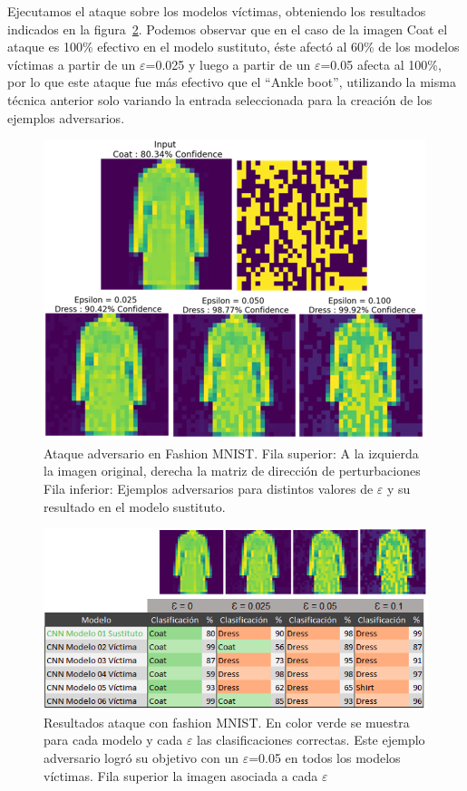 Ejecutamos el ataque sobre los modelos víctimas, obteniendo los resultados indicados en la figura~\ref{fig:41}. Podemos observar que en el caso de la imagen Coat el ataque es 100\% efectivo en el modelo sustituto, éste afectó al 60\% de los modelos víctimas a partir de un $\varepsilon$=0.025 y luego a partir de un $\varepsilon$=0.05 afecta al 100\%, por lo que este ataque fue más efectivo que el “Ankle boot”, utilizando la misma técnica anterior solo variando la entrada seleccionada para la creación de los ejemplos adversarios.

\begin{figure}[!h]
\centering
\includegraphics[scale = 1]{Figures/figura_40.PNG}
\decoRule
\caption[Resultados ataque 2 con fashion MNIST.]{Ataque adversario en Fashion MNIST. 
Fila superior: A la izquierda la imagen original, derecha la matriz de dirección de perturbaciones
Fila inferior: Ejemplos adversarios para distintos valores de $\varepsilon$ y su resultado en el modelo sustituto.
}
\label{fig:40}
\end{figure}


\begin{figure}[!h]
\centering
\includegraphics[scale = 0.85]{Figures/figura_41.PNG}
\decoRule
\caption[Resultados ataque 2 con fashion MNIST.]{Resultados ataque con fashion MNIST. En color verde se  muestra  para  cada  modelo  y  cada $\varepsilon$ las  clasificaciones  correctas. Este ejemplo adversario logró su objetivo con un $\varepsilon$=0.05 en todos los modelos víctimas. Fila superior la imagen asociada a cada $\varepsilon$}
\label{fig:41}
\end{figure}


